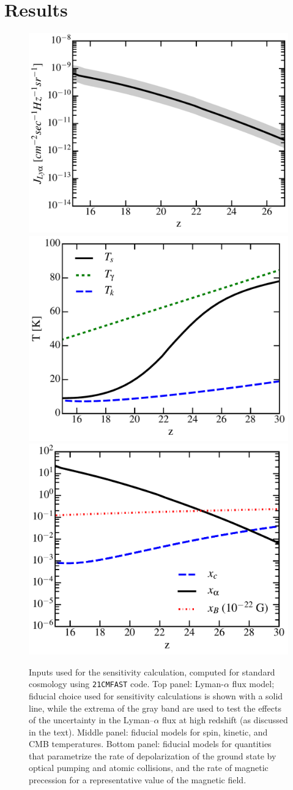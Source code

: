 \section{Results}
\label{sec:results}

\begin{figure}
\centering
\includegraphics[width=.35\textwidth,keepaspectratio=true]{Jlya.pdf}
\includegraphics[width=.35\textwidth,keepaspectratio=true]{Ts.pdf}
\includegraphics[width=.35\textwidth,keepaspectratio=true]{xs.pdf}
\caption{Inputs used for the sensitivity calculation, computed for standard cosmology using \texttt{21CMFAST} code. Top panel: Lyman-$\alpha$ flux model; fiducial choice used for sensitivity calculations is shown with a solid line, while the extrema of the gray band are used to test the effects of the uncertainty in the Lyman--$\alpha$ flux at high redshift (as discussed in the text). Middle panel: fiducial models for spin, kinetic, and CMB temperatures. Bottom panel: fiducial models for quantities that parametrize the rate of depolarization of the ground state by optical pumping and atomic collisions, and the rate of magnetic precession for a representative value of the magnetic field. \label{fig:cosmo}}
\end{figure}
